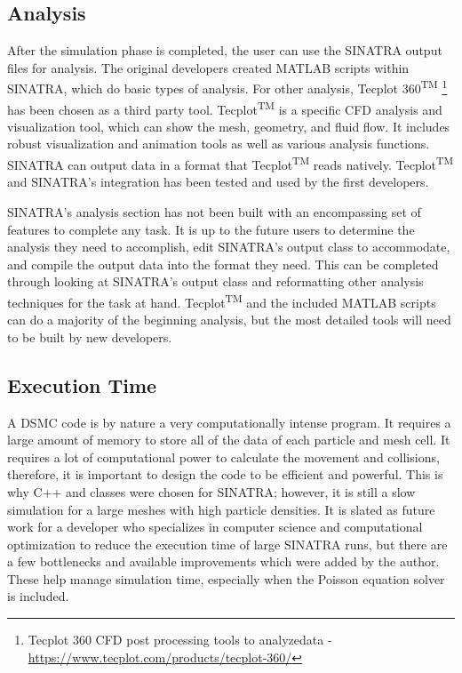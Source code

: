 

\subsection{Analysis}


 After the simulation phase is completed, the user can use the SINATRA output files for analysis. The original developers created MATLAB scripts within SINATRA, which do basic types of analysis. For other analysis, Tecplot 360\textsuperscript{TM} \footnote{Tecplot 360 CFD post processing tools to analyzedata - \url{https://www.tecplot.com/products/tecplot-360/}} has been chosen as a third party tool. Tecplot\textsuperscript{TM} is a specific CFD analysis and visualization tool, which can show the mesh, geometry, and fluid flow. It includes robust visualization and animation tools as well as various analysis functions. SINATRA can output data in a format that Tecplot\textsuperscript{TM} reads natively. Tecplot\textsuperscript{TM} and SINATRA’s integration has been tested and used by the first developers.\par
 \indent SINATRA’s analysis section has not been built with an encompassing set of features to complete any task. It is up to the future users to determine the analysis they need to accomplish, edit SINATRA’s output class to accommodate, and compile the output data into the format they need. This can be completed through looking at SINATRA’s output class and reformatting other analysis techniques for the task at hand. Tecplot\textsuperscript{TM} and the included MATLAB scripts can do a majority of the beginning analysis, but the most detailed tools will need to be built by new developers.

 
\subsection{Execution Time}
\label{sec:execution}
A DSMC code is by nature a very computationally intense program. It requires a large amount of memory to store all of the data of each particle and mesh cell. It requires a lot of computational power to calculate the movement and collisions, therefore, it is important to design the code to be efficient and powerful. This is why C++ and classes were chosen for SINATRA; however, it is still a slow simulation for a large meshes with high particle densities. It is slated as future work for a developer who specializes in computer science and computational optimization to reduce the execution time of large SINATRA runs, but there are a few bottlenecks and available improvements which were added by the author. These help manage simulation time, especially when the Poisson equation solver is included. \par

